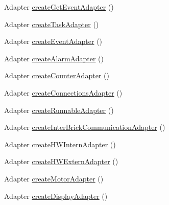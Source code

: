\begin{DoxyCompactItemize}
\item 
Adapter \hyperlink{classshootingmachineemfmodel_1_1provider_1_1_shootingmachineemfmodel_item_provider_adapter_factory_a46fe46ebf853d6df0feb652359487cc7}{create\-Get\-Event\-Adapter} ()
\item 
Adapter \hyperlink{classshootingmachineemfmodel_1_1provider_1_1_shootingmachineemfmodel_item_provider_adapter_factory_ac3c27fc87bc5ea2ed2915468b4bf4579}{create\-Task\-Adapter} ()
\item 
Adapter \hyperlink{classshootingmachineemfmodel_1_1provider_1_1_shootingmachineemfmodel_item_provider_adapter_factory_a9c4597bf99166457f62d81047736f197}{create\-Event\-Adapter} ()
\item 
Adapter \hyperlink{classshootingmachineemfmodel_1_1provider_1_1_shootingmachineemfmodel_item_provider_adapter_factory_a42f2f4c1cab02d150634f833d27e78ae}{create\-Alarm\-Adapter} ()
\item 
Adapter \hyperlink{classshootingmachineemfmodel_1_1provider_1_1_shootingmachineemfmodel_item_provider_adapter_factory_a33eaa85317f695ee7304a1509b85c4f7}{create\-Counter\-Adapter} ()
\item 
Adapter \hyperlink{classshootingmachineemfmodel_1_1provider_1_1_shootingmachineemfmodel_item_provider_adapter_factory_a64316a1c56478993d58715bdeb74b7e2}{create\-Connections\-Adapter} ()
\item 
Adapter \hyperlink{classshootingmachineemfmodel_1_1provider_1_1_shootingmachineemfmodel_item_provider_adapter_factory_ac926241ffc4e802f35f23a8c9a585361}{create\-Runnable\-Adapter} ()
\item 
Adapter \hyperlink{classshootingmachineemfmodel_1_1provider_1_1_shootingmachineemfmodel_item_provider_adapter_factory_aba17cb90658012c970173e81ebafd55b}{create\-Inter\-Brick\-Communication\-Adapter} ()
\item 
Adapter \hyperlink{classshootingmachineemfmodel_1_1provider_1_1_shootingmachineemfmodel_item_provider_adapter_factory_a340328d0626379ddf4acd3a6de6dd8c4}{create\-H\-W\-Intern\-Adapter} ()
\item 
Adapter \hyperlink{classshootingmachineemfmodel_1_1provider_1_1_shootingmachineemfmodel_item_provider_adapter_factory_aee1417f07ec900c5a196b9e18cc9da1d}{create\-H\-W\-Extern\-Adapter} ()
\item 
Adapter \hyperlink{classshootingmachineemfmodel_1_1provider_1_1_shootingmachineemfmodel_item_provider_adapter_factory_ab5f437ef10ff0074050882a4c5d8fbc5}{create\-Motor\-Adapter} ()
\item 
Adapter \hyperlink{classshootingmachineemfmodel_1_1provider_1_1_shootingmachineemfmodel_item_provider_adapter_factory_a4367107991bc7b9b49bce3008d136a4a}{create\-Display\-Adapter} ()

\end{DoxyCompactItemize}
